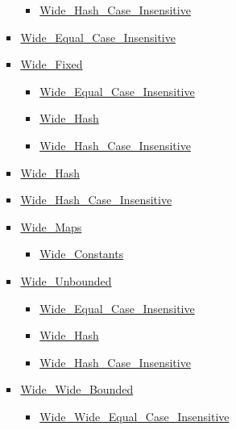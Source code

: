 \documentclass[english]{article}
\begin{document}
\begin{scriptsize}
\begin{multicols*}{5}
\begin{itemize}[leftmargin=0mm]
\begin{itemize}[leftmargin=5mm]
\begin{itemize}[leftmargin=5mm]
\begin{itemize}[leftmargin=5mm]
	  \item[] \href{http://www.ada-auth.org/standards/22rm/html/RM-A-4-7.html}{Wide\_Hash\_Case\_Insensitive}
	  \end{itemize}
	\item[] \href{http://www.ada-auth.org/standards/22rm/html/RM-A-4-7.html}{Wide\_Equal\_Case\_Insensitive}
	\item[] \href{http://www.ada-auth.org/standards/22rm/html/RM-A-4-7.html}{Wide\_Fixed}
	  \begin{itemize}[leftmargin=5mm]
	  \item[] \href{http://www.ada-auth.org/standards/22rm/html/RM-A-4-7.html}{Wide\_Equal\_Case\_Insensitive}
	  \item[] \href{http://www.ada-auth.org/standards/22rm/html/RM-A-4-7.html}{Wide\_Hash}
	  \item[] \href{http://www.ada-auth.org/standards/22rm/html/RM-A-4-7.html}{Wide\_Hash\_Case\_Insensitive}
	  \end{itemize}
	\item[] \href{http://www.ada-auth.org/standards/22rm/html/RM-A-4-7.html}{Wide\_Hash}
	\item[] \href{http://www.ada-auth.org/standards/22rm/html/RM-A-4-7.html}{Wide\_Hash\_Case\_Insensitive}
	\item[] \href{http://www.ada-auth.org/standards/22rm/html/RM-A-4-7.html}{Wide\_Maps}
	  \begin{itemize}[leftmargin=5mm]
	  \item[] \href{http://www.ada-auth.org/standards/22rm/html/RM-A-4-7.html}{Wide\_Constants}
	  \end{itemize}
	\item[] \href{http://www.ada-auth.org/standards/22rm/html/RM-A-4-7.html}{Wide\_Unbounded}
	  \begin{itemize}[leftmargin=5mm]
	  \item[] \href{http://www.ada-auth.org/standards/22rm/html/RM-A-4-7.html}{Wide\_Equal\_Case\_Insensitive}
	  \item[] \href{http://www.ada-auth.org/standards/22rm/html/RM-A-4-7.html}{Wide\_Hash}
	  \item[] \href{http://www.ada-auth.org/standards/22rm/html/RM-A-4-7.html}{Wide\_Hash\_Case\_Insensitive}
	  \end{itemize}
	\item[] \href{http://www.ada-auth.org/standards/22rm/html/RM-A-4-8.html}{Wide\_Wide\_Bounded}
	  \begin{itemize}[leftmargin=5mm]
	  \item[] \href{http://www.ada-auth.org/standards/22rm/html/RM-A-4-8.html}{Wide\_Wide\_Equal\_Case\_Insensitive}

\end{itemize}
\end{itemize}
\end{itemize}
\end{itemize}
\end{multicols*}
\end{scriptsize}
\end{document}
